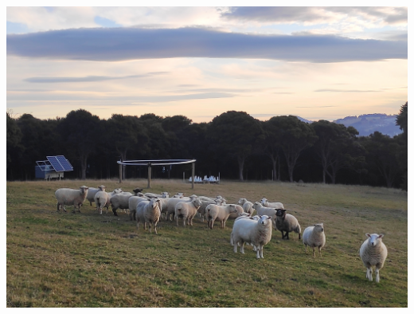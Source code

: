 \documentclass[ignorenonframetext]{beamer}
\begin{document}
\begin{frame}
\includegraphics[width=\linewidth]{fig/radio_agronomy.jpg}
\end{frame}
\end{document}
